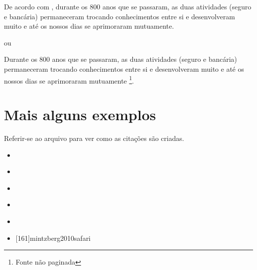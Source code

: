 De acordo com \textcite[cap. 1]{cnseg2017mercado}, durante os 800 anos que se passaram,
as duas atividades (seguro e bancária) permaneceram trocando conhecimentos entre si e
desenvolveram muito e até os nossos dias se aprimoraram mutuamente.

ou

Durante os 800 anos que se passaram, as duas atividades (seguro e bancária) permaneceram
trocando conhecimentos entre si e desenvolveram muito e até os nossos dias se aprimoraram
mutuamente \parencite[cap. 1]{cnseg2017mercado}\footnote{Fonte não paginada}.

\section{Mais alguns exemplos}

Referir-se ao arquivo  para ver como as citações são criadas.

\begin{itemize}
  \item \cite[ver:][30--42]{churchill2012marketing}
  \item \textcites[142-146]{churchill2012marketing}[21--23]{biolife2008}[45]{simon1997administrative}
  \item \cites[142-146]{churchill2012marketing}[21--23]{biolife2008}[45]{simon1997administrative}
  \item \cite{nouri2025}
  \item \cite{marginalrevolutionBordaCount}
  \item {}[161]{mintzberg2010safari}
\end{itemize}
